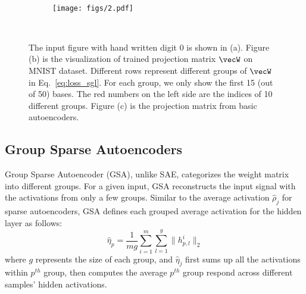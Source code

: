 \begin{figure*}[h]
    \centering
    \begin{subfigure}[b]{0.2\textwidth}
        \caption{}
        \label{fig:img}
    \end{subfigure}
    ~ %
    \begin{subfigure}[b]{0.45\textwidth}
        \texttt{[image: figs/2.pdf]}
        \caption{}
        \label{fig:w1}
    \end{subfigure}
    ~ %
    \begin{subfigure}[b]{0.28\textwidth}
        \caption{}
        \label{fig:w2}
    \end{subfigure}
    \caption{The input figure with hand written digit $0$ is shown in (a). Figure (b) is the visualization of trained projection matrix $\vecW$ on MNIST dataset. Different rows represent different groups of $\vecW$ in Eq.~\ref{eq:loss_sgl}. 
For each group, we only show the first 15 (out of 50) bases. The red numbers on the left side are the indices of 10 different groups. Figure (c) is the projection matrix from basic autoencoders.%
}\label{fig:vis}
\end{figure*}


\subsection{Group Sparse Autoencoders}
Group Sparse Autoencoder (GSA), unlike SAE, categorizes the weight matrix into different groups. 
For a given input, GSA reconstructs the input signal with the activations from only a few groups. 
Similar to the average activation $\hat{\rho}_j$ for sparse autoencoders, GSA defines each grouped average activation for the hidden layer as follows: 
\begin{equation}\label{eq:eta_hat_j}
    \hat{\eta}_p = \frac{1}{mg}\sum_{i=1}^m \sum_{l=1}^g  \| h^{i}_{p,l} \| _2
\end{equation}
where $g$ represents the size of each group, and $\hat{\eta}_j$ first sums up all the activations within $p^{th}$ group, then computes the average $p^{th}$ group respond across different samples' hidden activations. 

